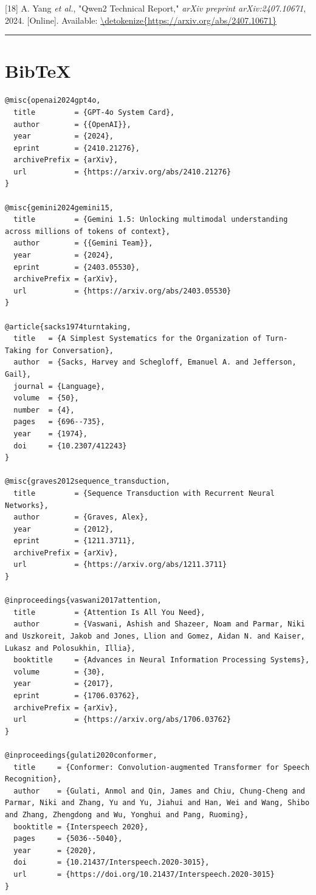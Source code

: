 \documentclass[UTF8,a4paper,12pt]{ctexart}
\newcommand{\mdhrule}{\par\noindent\rule{\linewidth}{0.4pt}\par}
\begin{document}
[18] A. Yang \textit{et al.}, "Qwen2 Technical Report," \textit{arXiv preprint arXiv:2407.10671}, 2024. [Online]. Available: \url{\detokenize{https://arxiv.org/abs/2407.10671}}

\mdhrule




\section*{BibTeX}


\begin{Verbatim}[breaklines=true,breakanywhere=true]
@misc{openai2024gpt4o,
  title         = {GPT-4o System Card},
  author        = {{OpenAI}},
  year          = {2024},
  eprint        = {2410.21276},
  archivePrefix = {arXiv},
  url           = {https://arxiv.org/abs/2410.21276}
}

@misc{gemini2024gemini15,
  title         = {Gemini 1.5: Unlocking multimodal understanding across millions of tokens of context},
  author        = {{Gemini Team}},
  year          = {2024},
  eprint        = {2403.05530},
  archivePrefix = {arXiv},
  url           = {https://arxiv.org/abs/2403.05530}
}

@article{sacks1974turntaking,
  title   = {A Simplest Systematics for the Organization of Turn-Taking for Conversation},
  author  = {Sacks, Harvey and Schegloff, Emanuel A. and Jefferson, Gail},
  journal = {Language},
  volume  = {50},
  number  = {4},
  pages   = {696--735},
  year    = {1974},
  doi     = {10.2307/412243}
}

@misc{graves2012sequence_transduction,
  title         = {Sequence Transduction with Recurrent Neural Networks},
  author        = {Graves, Alex},
  year          = {2012},
  eprint        = {1211.3711},
  archivePrefix = {arXiv},
  url           = {https://arxiv.org/abs/1211.3711}
}

@inproceedings{vaswani2017attention,
  title         = {Attention Is All You Need},
  author        = {Vaswani, Ashish and Shazeer, Noam and Parmar, Niki and Uszkoreit, Jakob and Jones, Llion and Gomez, Aidan N. and Kaiser, Lukasz and Polosukhin, Illia},
  booktitle     = {Advances in Neural Information Processing Systems},
  volume        = {30},
  year          = {2017},
  eprint        = {1706.03762},
  archivePrefix = {arXiv},
  url           = {https://arxiv.org/abs/1706.03762}
}

@inproceedings{gulati2020conformer,
  title     = {Conformer: Convolution-augmented Transformer for Speech Recognition},
  author    = {Gulati, Anmol and Qin, James and Chiu, Chung-Cheng and Parmar, Niki and Zhang, Yu and Yu, Jiahui and Han, Wei and Wang, Shibo and Zhang, Zhengdong and Wu, Yonghui and Pang, Ruoming},
  booktitle = {Interspeech 2020},
  pages     = {5036--5040},
  year      = {2020},
  doi       = {10.21437/Interspeech.2020-3015},
  url       = {https://doi.org/10.21437/Interspeech.2020-3015}
}


\end{Verbatim}
\end{document}
